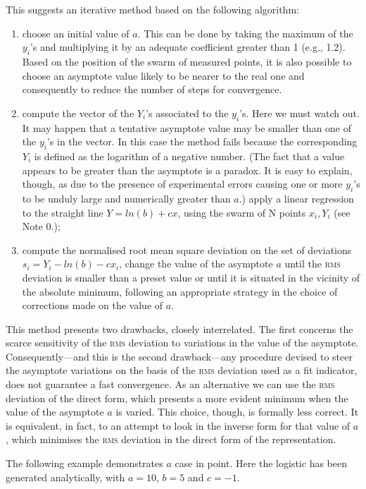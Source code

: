 \documentclass[%
 aip,
 jmp,%
 amsmath,amssymb,
 reprint,%
]{revtex4-1}
\begin{document}
This suggests an iterative method based on the following algorithm:
\begin{enumerate}
\item choose an initial value of $a$. This can be done by taking the  maximum of the $y_i$'s and multiplying it by an adequate coefficient greater than 1 (e.g., 1.2). Based on the position of the swarm of measured points, it is also possible to choose an asymptote value likely to be nearer to the real one and consequently to reduce the number of  steps for convergence.
\item compute the vector of  the $Y_i$'s  associated to the $y_i$'s. Here we must watch out. It may happen that a tentative asymptote value may be smaller than one of the $y_i$'s in the vector. In this case the  method fails because the corresponding $Y_i$ is defined as the logarithm of a negative number. (The fact that a value appears to be greater than the asymptote is a paradox. It is easy to explain, though, as due to the presence of experimental errors causing one or more $y_i$'s to be unduly large and numerically greater than $a$.)
apply a linear regression to the straight line $Y = ln(b) + cx$, using the swarm of N points $x_i, Y_i$ (see Note 0.);
\item compute the normalised root mean square deviation on the set of deviations $s_i =  Y_i -  ln(b) - cx_i$, change the value  of  the asymptote $a$ until the \textsc{rms} deviation is smaller than a preset value or until it is situated in the vicinity of the absolute minimum, following an appropriate strategy in the choice of corrections made on the value of $a$.
\end{enumerate}

This method  presents two  drawbacks, closely interrelated. The first concerns the scarce sensitivity of the \textsc{rms} deviation  to  variations  in the value  of the  asymptote.  Consequently---and this is the second drawback---any procedure devised to steer the asymptote variations on the basis of the \textsc{rms} deviation used as a fit indicator, does  not guarantee a fast convergence.
As an alternative we can use the \textsc{rms} deviation of the direct form, which presents a more evident minimum when the value of  the asymptote $a$ is varied. This choice, though, is formally less correct. It is equivalent, in fact, to  an attempt to look in the inverse form for that value of $a$, which minimises the \textsc{rms} deviation in the direct form  of  the representation.

The following example demonstrates $a$ case in point. Here the logistic has been generated analytically, with $a = 10$, $b = 5$  and  $c = -1$.
\end{document}
